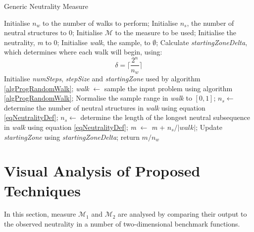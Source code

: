 \documentclass[conference]{IEEEtran}
\begin{document}
\begin{algorithm}[!t]
	\caption{Generic Neutrality Measure}
	\label{algNeutralityMeasure}
	\begin{algorithmic}
		\STATE Initialise $n_w$ to the number of walks to perform;
		\STATE Initialise $n_s$, the number of neutral structures to 0;
		\STATE Initialise $\mathcal{M}$ to the measure to be used;
		\STATE Initialise the neutrality, \textit{m} to 0;
		\STATE Initialise \textit{walk}, the sample, to $\emptyset$;
		\STATE Calculate \textit{startingZoneDelta}, which determines where each walk will begin, using:
		\begin{equation}
			\label{eqStartingZoneDelta}
			\delta = \biggr\lceil \frac{2^n}{n_w} \biggr\rceil
		\end{equation}
		\STATE Initialise \textit{numSteps}, \textit{stepSize} and \textit{startingZone} used by algorithm \ref{algProgRandomWalk};
			\STATE \textit{walk} $\gets$ sample the input problem using algorithm \ref{algProgRandomWalk};
			\STATE Normalise the sample range in \textit{walk} to $[0,1]$;
				\STATE $n_s \gets$ determine the number of neutral structures in \textit{walk} using equation \ref{eqNeutralityDef};
			\ELSE
				\STATE $n_s \gets$ determine the length of the longest neutral subsequence in \textit{walk} using equation \ref{eqNeutralityDef};		
			\ENDIF
			\STATE \textit{m} $\gets$ \textit{m} + $n_s/\lvert\textit{walk}\rvert$;	
			\STATE Update \textit{startingZone} using \textit{startingZoneDelta};
		\ENDFOR
		\STATE return $\textit{m}/n_w$
	\end{algorithmic}
\end{algorithm}

\section{Visual Analysis of Proposed Techniques}
\label{visualAnalysis}
In this section, measure $\mathcal{M}_1$ and $\mathcal{M}_2$ are analysed by comparing their output to the observed neutrality in a number of two-dimensional benchmark functions. 
\end{document}
